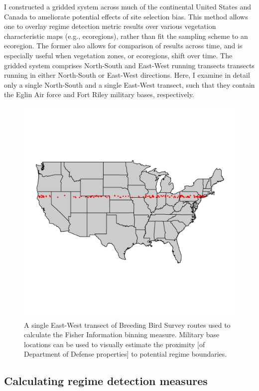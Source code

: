 \documentclass[12pt,twoside,openany]{reedthesis}
\begin{document}
I constructed a gridded system across much of the continental United States and Canada to ameliorate potential effects of site selection bias. This method allows one to overlay regime detection metric results over various vegetation characteristic maps (e.g., ecoregions), rather than fit the sampling scheme to an ecoregion. The former also allows for comparison of results across time, and is especially useful when vegetation zones, or ecoregions, shift over time. The gridded system comprises North-South and East-West running transects transects running in either North-South or East-West directions. Here, I examine in detail only a single North-South and a single East-West transect, such that they contain the Eglin Air force and Fort Riley military bases, respectively.
\begin{figure}

{\centering \includegraphics[width=0.85\linewidth]{./chapterFiles/fisherSpatial/figures/figsCalledInDiss/transectSamplingEx_row18} 

}

\caption{A single East-West transect of Breeding Bird Survey routes used to calculate the Fisher Information binning measure. Military base locations can be used to visually estimate the proximity [of Department of Defense properties] to potential regime boundaries.}\label{fig:ewRouteMap}
\end{figure}
\hypertarget{calculating-regime-detection-measures}{%
\subsection{Calculating regime detection measures}\label{calculating-regime-detection-measures}}
\end{document}
